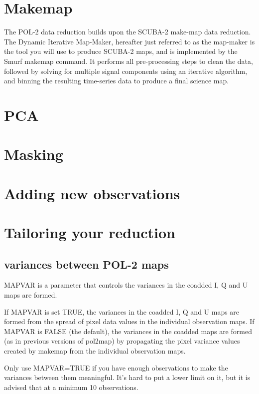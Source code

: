 \section{Makemap}

The POL-2 data reduction builds upon the SCUBA-2 make-map data reduction. The Dynamic Iterative Map-Maker, hereafter just referred to as the map-maker is the tool you will use to produce SCUBA-2 maps, and is implemented by the Smurf makemap command. It performs all pre-processing steps to clean the data, followed by solving for multiple signal components using an iterative algorithm, and binning the resulting time-series data to produce a final science map. 

\cite{smurf}

\section{PCA}


\section{Masking}


\section{Adding new observations}



\section{Tailoring your reduction}

\subsection*{variances between POL-2 maps}

MAPVAR is a parameter that controls the variances in the coadded 
I, Q and U maps are formed.

If  MAPVAR is set TRUE, the variances in the coadded I, Q and U maps
are formed from the spread of pixel data values in the individual
observation maps. If MAPVAR is FALSE (the default), the variances in
the coadded maps are formed (as in previous versions of pol2map) by
propagating the pixel variance values created by makemap from the
individual observation maps.

Only use MAPVAR=TRUE if you have enough observations to
make the variances between them meaningful. It's hard to put a lower
limit on it, but it is advised that at a minimum 10 observations.


